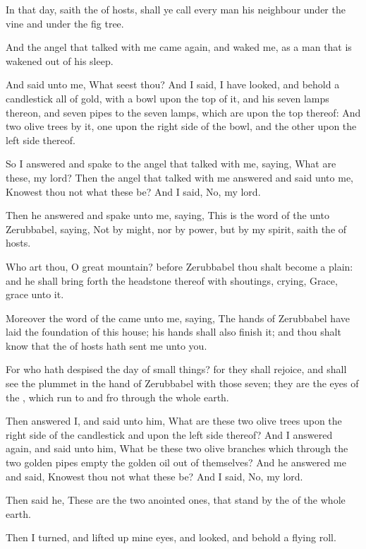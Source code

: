 \Verse In that day, saith the \LORD of hosts, shall ye call every man his neighbour under the vine and under the fig tree.


\Chapter
\Verse And the angel that talked with me came again, and waked me, as a man that is wakened out of his sleep.

\Verse And said unto me, What seest thou? And I said, I have looked, and behold a candlestick all of gold, with a bowl upon the top of it, and his seven lamps thereon, and seven pipes to the seven lamps, which are upon the top thereof: \Verse And two olive trees by it, one upon the right side of the bowl, and the other upon the left side thereof.

\Verse So I answered and spake to the angel that talked with me, saying, What are these, my lord?  \Verse Then the angel that talked with me answered and said unto me, Knowest thou not what these be? And I said, No, my lord.

\Verse Then he answered and spake unto me, saying, This is the word of the \LORD unto Zerubbabel, saying, Not by might, nor by power, but by my spirit, saith the \LORD of hosts.

\Verse Who art thou, O great mountain? before Zerubbabel thou shalt become a plain: and he shall bring forth the headstone thereof with shoutings, crying, Grace, grace unto it.

\Verse Moreover the word of the \LORD came unto me, saying, \Verse The hands of Zerubbabel have laid the foundation of this house; his hands shall also finish it; and thou shalt know that the \LORD of hosts hath sent me unto you.

\Verse For who hath despised the day of small things? for they shall rejoice, and shall see the plummet in the hand of Zerubbabel with those seven; they are the eyes of the \LORD, which run to and fro through the whole earth.

\Verse Then answered I, and said unto him, What are these two olive trees upon the right side of the candlestick and upon the left side thereof?  \Verse And I answered again, and said unto him, What be these two olive branches which through the two golden pipes empty the golden oil out of themselves?  \Verse And he answered me and said, Knowest thou not what these be? And I said, No, my lord.

\Verse Then said he, These are the two anointed ones, that stand by the \LORD of the whole earth.


\Chapter
\Verse Then I turned, and lifted up mine eyes, and looked, and behold a flying roll.

